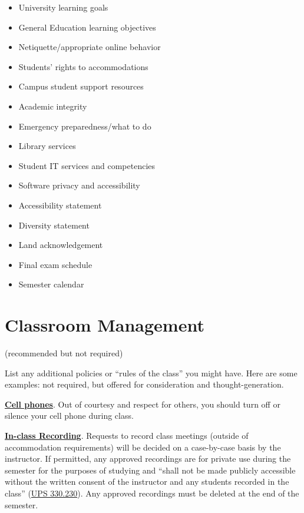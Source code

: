 \documentclass[12pt]{article}
\begin{document}
\begin{itemize}
\item University learning goals
\item General Education learning objectives
\item Netiquette/appropriate online behavior
\item Students' rights to accommodations
\item Campus student support resources
\item Academic integrity
\item Emergency preparedness/what to do
\item Library services
\item Student IT services and competencies
\item Software privacy and accessibility
\item Accessibility statement
\item Diversity statement
\item Land acknowledgement
\item Final exam schedule
\item Semester calendar
\end{itemize}

\section{Classroom Management} {\color{annotationblue}(recommended but not required)}

{\color{annotationblue}List any additional policies or ``rules of the class'' you might have. Here are some examples: not required, but offered for consideration and thought-generation.}

\textbf{\uline{Cell phones}}. {\color{suggestionred}Out of courtesy and respect for others, you should turn off or silence your cell phone during class.}

\textbf{\uline{In-class Recording}}. {\color{suggestionred}Requests to record class meetings (outside of accommodation requirements) will be decided on a case-by-case basis by the instructor. If permitted, any approved recordings are for private use during the semester for the purposes of studying and ``shall not be made publicly accessible without the written consent of the instructor and any students recorded in the class'' (\href{https://www.fullerton.edu/senate/publications_policies_resolutions/ups/UPS\%20300/UPS\%20330.230.pdf}{UPS 330.230}). Any approved recordings must be deleted at the end of the semester.}
\end{document}
